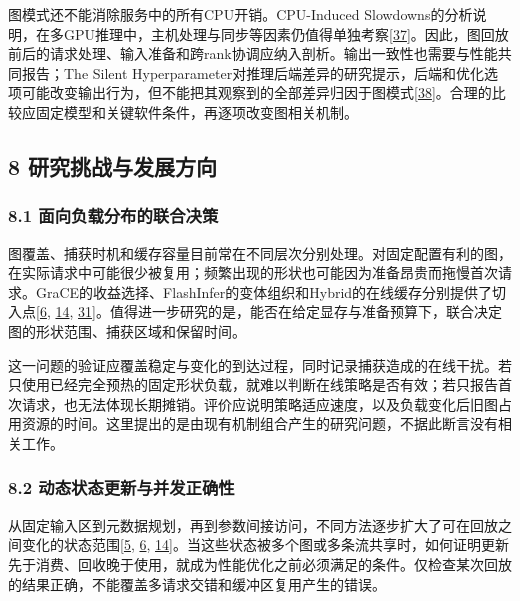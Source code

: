 \documentclass[UTF8,11pt,fontset=windows]{ctexart}
\begin{document}
图模式还不能消除服务中的所有CPU开销。CPU-Induced Slowdowns的分析说明，在多GPU推理中，主机处理与同步等因素仍值得单独考察\protect\hyperlink{ref-37}{{[}37{]}}。因此，图回放前后的请求处理、输入准备和跨rank协调应纳入剖析。输出一致性也需要与性能共同报告；The Silent Hyperparameter对推理后端差异的研究提示，后端和优化选项可能改变输出行为，但不能把其观察到的全部差异归因于图模式\protect\hyperlink{ref-38}{{[}38{]}}。合理的比较应固定模型和关键软件条件，再逐项改变图相关机制。

\hypertarget{section-8}{%
\subsection{\texorpdfstring{\textbf{8 研究挑战与发展方向}}{8 研究挑战与发展方向}}\label{section-8}}

\hypertarget{section-8-1}{%
\subsubsection{\texorpdfstring{\textbf{8.1 面向负载分布的联合决策}}{8.1 面向负载分布的联合决策}}\label{section-8-1}}

图覆盖、捕获时机和缓存容量目前常在不同层次分别处理。对固定配置有利的图，在实际请求中可能很少被复用；频繁出现的形状也可能因为准备昂贵而拖慢首次请求。GraCE的收益选择、FlashInfer的变体组织和Hybrid的在线缓存分别提供了切入点\protect\hyperlink{ref-6}{{[}6}, \protect\hyperlink{ref-14}{14}, \protect\hyperlink{ref-31}{31{]}}。值得进一步研究的是，能否在给定显存与准备预算下，联合决定图的形状范围、捕获区域和保留时间。

这一问题的验证应覆盖稳定与变化的到达过程，同时记录捕获造成的在线干扰。若只使用已经完全预热的固定形状负载，就难以判断在线策略是否有效；若只报告首次请求，也无法体现长期摊销。评价应说明策略适应速度，以及负载变化后旧图占用资源的时间。这里提出的是由现有机制组合产生的研究问题，不据此断言没有相关工作。

\hypertarget{section-8-2}{%
\subsubsection{\texorpdfstring{\textbf{8.2 动态状态更新与并发正确性}}{8.2 动态状态更新与并发正确性}}\label{section-8-2}}

从固定输入区到元数据规划，再到参数间接访问，不同方法逐步扩大了可在回放之间变化的状态范围\protect\hyperlink{ref-5}{{[}5}, \protect\hyperlink{ref-6}{6}, \protect\hyperlink{ref-14}{14{]}}。当这些状态被多个图或多条流共享时，如何证明更新先于消费、回收晚于使用，就成为性能优化之前必须满足的条件。仅检查某次回放的结果正确，不能覆盖多请求交错和缓冲区复用产生的错误。
\end{document}
